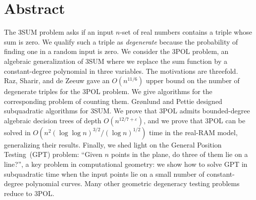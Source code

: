 \section{Abstract}

The 3SUM problem asks if an input $n$-set of real numbers contains a
triple whose sum is zero.
%
We qualify such a triple as \emph{degenerate} because the probability of
finding one in a random input is zero.
%
We consider the 3POL problem, an algebraic generalization of 3SUM where we
replace the sum function by a constant-degree polynomial in three variables.
%
The motivations are threefold.
%
Raz, Sharir, and de Zeeuw gave an $O(n^{11/6})$ upper bound on the number of
degenerate triples for the 3POL problem. We give algorithms for the
corresponding problem of counting them.
%
Gr\o nlund and Pettie designed subquadratic algorithms for 3SUM\@. We
prove that 3POL admits bounded-degree algebraic decision trees of depth
$O(n^{12/7+\varepsilon})$, and we prove that 3POL can be solved in $O(n^2
{(\log \log n)}^{3/2} / {(\log n)}^{1/2})$ time in the real-RAM model,
generalizing their results.
%
Finally, we shed light on the General
Position Testing~(GPT) problem: ``Given $n$ points in the plane, do three of
them lie on a line?'', a key problem in computational geometry: we show how to
solve GPT in subquadratic time when the input points lie on a small number of
constant-degree polynomial curves. Many other geometric degeneracy testing
problems reduce to 3POL\@.
%


